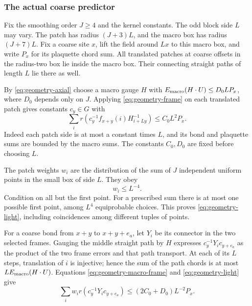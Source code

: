 \subsubsection{The actual coarse predictor}
Fix the smoothing order $J\ge4$ and the kernel constants. The odd block
side $L$ may vary. The patch has radius $(J+3)L$, and the macro box
has radius $(J+7)L$. Fix a coarse site $x$, lift the field around $Lx$
to this macro box, and write $P_x$ for its plaquette chord sum.
All translated patches at coarse offsets in the radius-two box lie
inside the macro box. Their connecting straight paths of length $L$
lie there as well.

By \eqref{eq:geometry-axial} choose a macro gauge $H$ with
$E_{\rm macro}(H\cdot U)\le D_0 LP_x$, where $D_0$ depends only on
$J$. Applying \eqref{eq:geometry-frame} on each translated patch gives
constants $c_y\in G$ with
\begin{equation}\label{eq:geometry-macro-frame}
 \sum_i r(c_y^{-1}f_{x+y}(i)H_{i+Ly}^{-1})\le C_0L^2P_x.
\end{equation}
Indeed each patch side is at most a constant times $L$, and its bond
and plaquette sums are bounded by the macro sums. The constants
$C_0,D_0$ are fixed before choosing $L$.

The patch weights $w_i$ are the distribution of the sum of $J$
independent uniform points in the small box of side $L$. They obey
\begin{equation}\label{eq:geometry-light}
 w_i\le L^{-4}.
\end{equation}
Condition on all but the first point. For a prescribed sum there is
at most one possible first point, among $L^4$ equiprobable choices.
This proves \eqref{eq:geometry-light}, including coincidences among
different tuples of points.

For a coarse bond from $x+y$ to $x+y+e_a$, let $Y_i$ be its connector
in the two selected frames. Gauging the middle straight path by $H$
expresses $c_y^{-1}Y_ic_{y+e_a}$ as the product of the two frame
errors and that path transport. At each of its $L$ steps, translation
of $i$ is injective; hence the sum of the path chords is at most
$L E_{\rm macro}(H\cdot U)$. Equations
\eqref{eq:geometry-macro-frame} and \eqref{eq:geometry-light} give
\begin{equation}\label{eq:geometry-connector}
 \sum_i w_i r(c_y^{-1}Y_ic_{y+e_a})
       \le(2C_0+D_0)L^{-2}P_x.
\end{equation}

